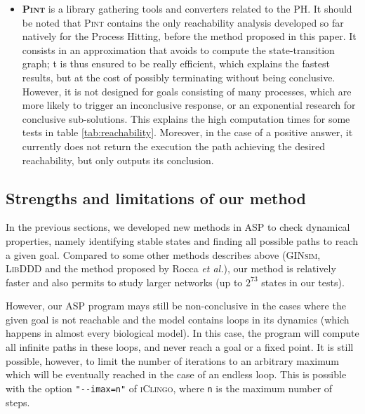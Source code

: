 \begin{itemize}
\item \textbf{\textsc{Pint}}
is a library gathering tools and converters related to the PH.
It should be noted that \textsc{Pint} contains the only reachability analysis
developed so far natively for the Process Hitting,
before the method proposed in this paper.
It consists in an approximation that avoids to compute the state-transition graph;
t is thus ensured to be really efficient, which explains the fastest results,
but at the cost of possibly terminating without being conclusive.
However, it is not designed for goals consisting of many processes,
which are more likely to trigger an inconclusive response,
or an exponential research for conclusive sub-solutions.
This explains the high computation times for some tests in table \ref{tab:reachability}.
Moreover, in the case of a positive answer,
it currently does not return the execution the path achieving the desired reachability,
but only outputs its conclusion.
\end{itemize}

\subsection{Strengths and limitations of our method}
\label{limitations}

In the previous sections,
we developed new methods in ASP to check dynamical properties,
namely identifying stable states and finding all possible paths to reach a given goal.
Compared to some other methods describes above
(\textsc{GINsim}, \textsc{LibDDD} and the method proposed by Rocca \textit{et al.}),
our method is relatively faster and also permits to study larger networks
(up to $2^{73}$ states in our tests).

However, our ASP program mays still be non-conclusive
in the cases where the given goal is not
reachable and the model contains loops in its dynamics
(which happens in almost every biological model).
In this case, the program will compute all infinite paths in these loops,
and never reach a goal or a fixed point.
It is still possible, however, to limit the number of iterations to an arbitrary
maximum which will be eventually reached in the case of an endless loop.
This is possible with the option \texttt{"-{}-imax=n"} of \textsc{iClingo},
where \texttt{n} is the maximum number of steps.


